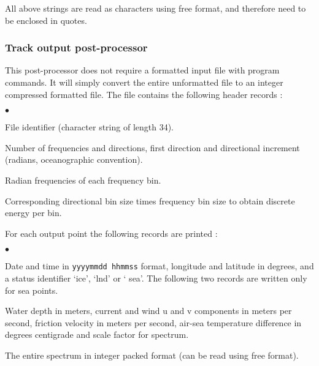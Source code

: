 \noindent
All above strings are read as characters using free format, and therefore need
to be enclosed in quotes.


\pb
\vsssub
\subsubsection{Track output post-processor} \label{sec:post_t}
\vsssub


\vspace{\baselineskip} 
\noindent
This post-processor does not require a formatted input file with program
commands. It will simply convert the entire unformatted file to an integer
compressed formatted file. The file contains the following header records :

\begin{list}{$\bullet$}{\itemsep 0mm \parsep 0mm}
\item File identifier (character string of length 34).
\item Number of frequencies and directions, first direction and directional
      increment (radians, oceanographic convention).
\item Radian frequencies of each frequency bin.
\item Corresponding directional bin size times frequency bin size to obtain
      discrete energy per bin.
\end{list}

\noindent
For each output point the following records are printed :
\begin{list}{$\bullet$}{\itemsep 0mm \parsep 0mm}
\item Date and time in {\tt yyyymmdd hhmmss} format, longitude and latitude in
      degrees, and a status identifier `{\F ice}', `{\F lnd}' or `{\F
      sea}'. The following two records are written only for sea points.
\item Water depth in meters, current and wind u and v components in meters per
      second, friction velocity in meters per second, air-sea temperature
      difference in degrees centigrade and scale factor for spectrum.
\item The entire spectrum in integer packed format (can be read using free
      format).
\end{list}


